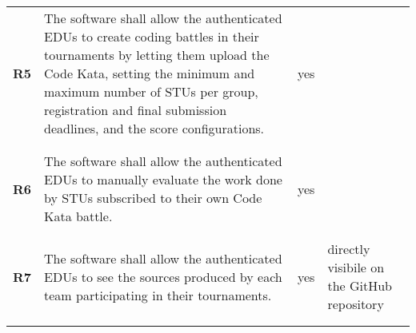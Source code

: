 \begin{longtable}[H]{l p{8cm} l p{2cm}}
    \textbf{R5}  & The software shall allow the authenticated EDUs to create coding battles in their tournaments by letting them upload the Code Kata, setting the minimum and maximum number of STUs per group, registration and final submission deadlines, and the score configurations. & {\color{green}yes}   &                                                                                         \\
                 &                                                                                                                                                                                                                                                                          &                      &                                                                                         \\\hline & & & \\
    \textbf{R6}  & The software shall allow the authenticated EDUs to manually evaluate the work done by STUs subscribed to their own Code Kata battle.                                                                                                                                     & {\color{green}yes}   &                                                                                         \\
                 &                                                                                                                                                                                                                                                                          &                      &                                                                                         \\\hline & & & \\
    \textbf{R7}  & The software shall allow the authenticated EDUs to see the sources produced by each team participating in their tournaments.                                                                                                                                             & {\color{green}yes}   & directly visibile on the GitHub repository                                              \\
                 &                                                                                                                                                                                                                                                                          &                      &                                                                                         \\\hline & & & \\

\end{longtable}
